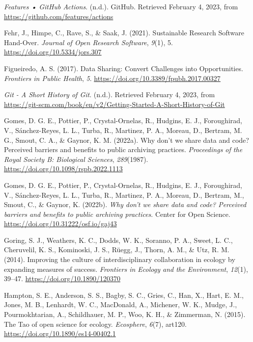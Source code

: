 \begin{CSLReferences}{1}{0}
\leavevmode{}%
\emph{Features • GitHub Actions}. (n.d.). GitHub. Retrieved February 4, 2023, from \url{https://github.com/features/actions}

\leavevmode{}%
Fehr, J., Himpe, C., Rave, S., \& Saak, J. (2021). Sustainable Research Software Hand-Over. \emph{Journal of Open Research Software}, \emph{9}(1), 5. \url{https://doi.org/10.5334/jors.307}

\leavevmode{}%
Figueiredo, A. S. (2017). Data Sharing: Convert Challenges into Opportunities. \emph{Frontiers in Public Health}, \emph{5}. \url{https://doi.org/10.3389/fpubh.2017.00327}

\leavevmode{}%
\emph{Git - A Short History of Git}. (n.d.). Retrieved February 4, 2023, from \url{https://git-scm.com/book/en/v2/Getting-Started-A-Short-History-of-Git}

\leavevmode{}%
Gomes, D. G. E., Pottier, P., Crystal-Ornelas, R., Hudgins, E. J., Foroughirad, V., Sánchez-Reyes, L. L., Turba, R., Martinez, P. A., Moreau, D., Bertram, M. G., Smout, C. A., \& Gaynor, K. M. (2022a). Why don't we share data and code? Perceived barriers and benefits to public archiving practices. \emph{Proceedings of the Royal Society B: Biological Sciences}, \emph{289}(1987). \url{https://doi.org/10.1098/rspb.2022.1113}

\leavevmode{}%
Gomes, D. G. E., Pottier, P., Crystal-Ornelas, R., Hudgins, E. J., Foroughirad, V., Sánchez-Reyes, L. L., Turba, R., Martinez, P. A., Moreau, D., Bertram, M., Smout, C., \& Gaynor, K. (2022b). \emph{Why don't we share data and code? Perceived barriers and benefits to public archiving practices}. Center for Open Science. \url{https://doi.org/10.31222/osf.io/gaj43}

\leavevmode{}%
Goring, S. J., Weathers, K. C., Dodds, W. K., Soranno, P. A., Sweet, L. C., Cheruvelil, K. S., Kominoski, J. S., Rüegg, J., Thorn, A. M., \& Utz, R. M. (2014). Improving the culture of interdisciplinary collaboration in ecology by expanding measures of success. \emph{Frontiers in Ecology and the Environment}, \emph{12}(1), 39--47. \url{https://doi.org/10.1890/120370}

\leavevmode{}%
Hampton, S. E., Anderson, S. S., Bagby, S. C., Gries, C., Han, X., Hart, E. M., Jones, M. B., Lenhardt, W. C., MacDonald, A., Michener, W. K., Mudge, J., Pourmokhtarian, A., Schildhauer, M. P., Woo, K. H., \& Zimmerman, N. (2015). The Tao of open science for ecology. \emph{Ecosphere}, \emph{6}(7), art120. \url{https://doi.org/10.1890/es14-00402.1}


\end{CSLReferences}

